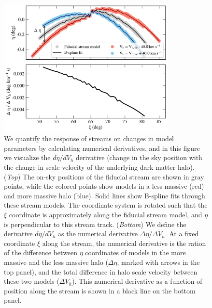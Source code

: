 \documentclass[modern]{aastex61}
\begin{document}
\begin{figure}
\begin{center}
\includegraphics[width=0.8\textwidth]{derivative_vis.pdf}
\caption{We quantify the response of streams on changes in model parameters by calculating numerical derivatives, and in this figure we visualize the $d\eta / d V_h$ derivative (change in the sky position with the change in scale velocity of the underlying dark matter halo).
(\emph{Top}) The on-sky positions of the fiducial stream are shown in gray points, while the colored points show models in a less massive (red) and more massive halo (blue).
Solid lines show B-spline fits through these stream models.
The coordinate system is rotated such that the $\xi$ coordinate is approximately along the fiducial stream model, and $\eta$ is perpendicular to this stream track. 
(\emph{Bottom}) We define the derivative $d\eta / d V_h$ as the numerical derivative $\Delta\eta / \Delta V_h$.
At a fixed coordinate $\xi$ along the stream, the numerical derivative is the ration of the difference between $\eta$ coordinates of models in the more massive and the less massive halo ($\Delta\eta$, marked with arrows in the top panel), and the total difference in halo scale velocity between these two models ($\Delta V_h$).
This numerical derivative as a function of position along the stream is shown in a black line on the bottom panel.
}
\label{fig:derivative_steps}
\end{center}
\end{figure}
\end{document}

